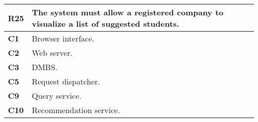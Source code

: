 \begin{table}[H]
    \centering
    \begin{tabular}{|l|m{10cm}|}
        \hline \textbf{R25} & The system must allow a registered company to visualize a list of suggested students.\\
        \hline \textbf{C1} & Browser interface. \\
        \hline \textbf{C2} & Web server. \\
        \hline \textbf{C3} & DMBS. \\
        \hline \textbf{C5} & Request dispatcher. \\
        \hline \textbf{C9} & Query service. \\
        \hline \textbf{C10} & Recommendation service. \\
        \hline
    \end{tabular}
\end{table}

